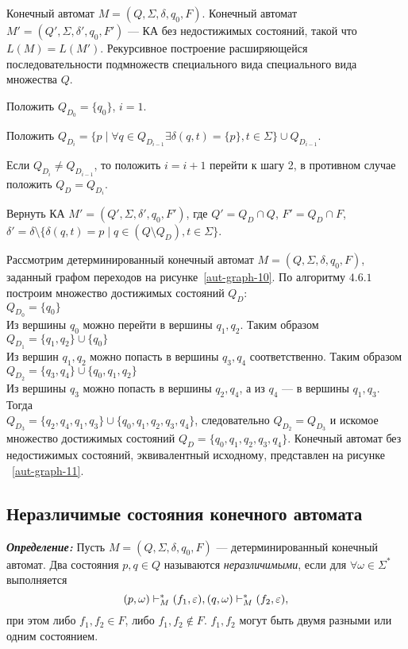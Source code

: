 {
	Конечный автомат $M = (Q,\Sigma, \delta, q_0, F)$.
}
{
	Конечный автомат $M' = (Q',\Sigma, \delta', q_0, F')$ --- КА без недостижимых состояний, такой что $L(M) = L(M')$.
}
{
 Рекурсивное построение расширяющейся последовательности подмножеств специального вида специального вида множества $Q$.
}
{
\item Положить $Q_{D_0}=\{q_0\}$, $i=1$.
\item Положить $Q_{D_i}=\{p \mid  \forall q \in Q_{D_{i-1}} \exists \delta(q, t) = \{p\}, t \in \Sigma  \}\cup Q_{D_{i-1}}$.
\item Если $Q_{D_i}\neq Q_{D_{i-1}}$, то положить $i=i+1$ перейти к шагу 2, в противном случае положить $Q_D=Q_{D_i}$.
\item Вернуть КА $M'=(Q',\Sigma, \delta', q_0, F')$, где $Q'=Q_D\cap Q$, $F'=Q_D\cap F$, $\delta' = \delta \setminus \{ \delta(q, t) = p \mid q \in (Q \setminus Q_D), t \in \Sigma \}$.
}

\begin{myexample}
Рассмотрим детерминированный конечный автомат $M = (Q,\Sigma, \delta, q_0, F)$, заданный графом переходов на рисунке~\ref{aut-graph-10}. По алгоритму $4.6.1$ построим множество достижимых состояний $Q_D$: \\
$Q_{D_0} = \{ q_0 \}$ \\
Из вершины $q_0$ можно перейти в вершины $q_1, q_2$. Таким образом \\
$Q_{D_1} = \{ q_1, q_2 \} \cup \{ q_0 \} $ \\
Из вершин $q_1, q_2$ можно попасть в вершины $q_3, q_4$ соответственно. Таким образом \\
$Q_{D_2} = \{ q_3, q_4 \} \cup \{ q_0, q_1, q_2 \} $ \\
Из вершины $q_3$ можно попасть в вершины $q_2, q_4$, а из $q_4$ --- в вершины $q_1, q_3$. Тогда \\
$Q_{D_3} = \{ q_2, q_4, q_1, q_3 \} \cup \{ q_0, q_1, q_2, q_3, q_4 \} $, следовательно $Q_{D_2} = Q_{D_3}$ и искомое множество достижимых состояний $Q_D = \{ q_0, q_1, q_2, q_3, q_4 \}$.
Конечный автомат без недостижимых состояний, эквивалентный исходному, представлен на рисунке ~\ref{aut-graph-11}.
\end{myexample}




\subsection*{Неразличимые состояния конечного автомата}
\textit{\textbf{Определение:}} Пусть $M = (Q,\Sigma, \delta, q_0, F)$ --- детерминированный конечный автомат. Два состояния $p, q \in Q$ называются \textit{неразличимыми}, если для $\forall \omega \in \Sigma^*$ выполняется \[ (p, \omega) \vdash_M^* (f_1, \varepsilon), (q, \omega) \vdash_M^* (f_2, \varepsilon), \] при этом либо $f_1, f_2 \in F$, либо $f_1, f_2 \notin F$. $f_1, f_2$ могут быть двумя разными или одним состоянием.


